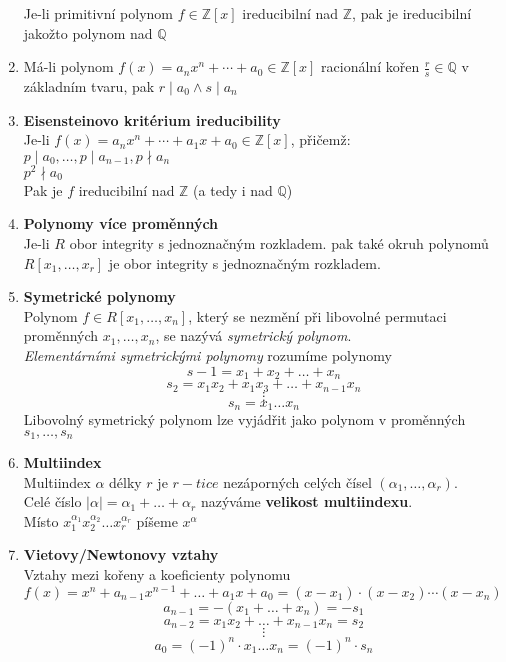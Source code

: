 \documentclass[12pt,a4paper]{article}
\begin{document}
\begin{enumerate}
					Je-li primitivní polynom $f \in \mathbb{Z}[x]$ ireducibilní  nad $\mathbb{Z}$, pak je ireducibilní jakožto polynom nad $\mathbb{Q}$
			\item Má-li polynom $f(x) = a_nx^n+\cdots+a_0 \in \mathbb{Z}[x]$ racionální kořen $\frac{r}{s} \in \mathbb{Q}$ v 	základním tvaru, pak $r \mid a_0 \land s \mid a_n$
			\item \textbf{Eisensteinovo kritérium ireducibility}\\
					Je-li $f(x) = a_nx^n+\cdots+a_1x+a_0 \in \mathbb{Z}[x]$, přičemž:\\
					$p \mid a_0, \dots, p \mid a_{n-1},p \nmid a_n$\\
					$p^2 \nmid a_0$\\
					Pak je $f$ ireducibilní nad $\mathbb{Z}$ (a tedy i nad $\mathbb{Q}$)
			\item \textbf{Polynomy více proměnných}\\
					Je-li $R$ obor integrity s jednoznačným rozkladem. pak také okruh polynomů $R[x_1,\dots,x_r]$ je obor integrity s jednoznačným rozkladem.
			\item \textbf{Symetrické polynomy}\\
					Polynom $f \in R[x_1,\dots,x_n]$, který se nezmění při libovolné permutaci proměnných $x_1,\dots,x_n$, se nazývá \textit{symetrický polynom}.\\ \textit{Elementárními symetrickými polynomy} rozumíme polynomy\\
					\[s-1 = x_1 + x_2 + \dots + x_n  \]\[  s_2 = x_1x_2 + x_1x_3 + \dots + x_{n-1}x_n\] \[\vdots\]\[s_n=x_1\dots x_n\]
					Libovolný symetrický polynom lze vyjádřit jako polynom v proměnných $s_1,\dots,s_n$
			\item \textbf{Multiindex}\\
					Multiindex $\alpha$ délky $r$ je  $r-tice$ nezáporných celých čísel $(\alpha_1,\dots,\alpha_r)$.\\ Celé číslo $|\alpha| = \alpha_1+\dots+\alpha_r$ nazýváme \textbf{velikost multiindexu}.\\Místo $x_1^{\alpha_1}x_2^{\alpha_2} \dots x_r^{\alpha_r}$ píšeme $x^\alpha$
					
			\item \textbf{Vietovy/Newtonovy vztahy}\\
					Vztahy mezi kořeny a koeficienty polynomu\\
					$f(x) = x^n+a_{n-1}x^{n-1}+ \dots + a_1x + a_0 = (x-x_1)\cdot (x-x_2) \cdots (x-x_n)$
					\[a_{n-1} = -(x_1+\dots +x_n)=-s_1\] \[a_{n-2} = x_1x_2+\dots+x_{n-1}x_n = s_2\] \[\vdots\] 
					\[a_0 = (-1)^n \cdot x_1 \dots x_n = (-1)^n \cdot s_n\]
			

\end{enumerate}
\end{document}
